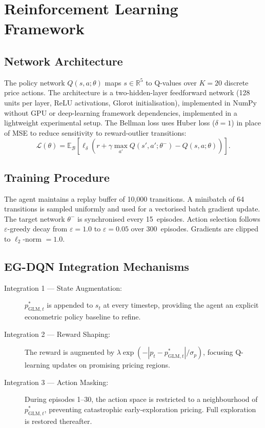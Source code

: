 \documentclass[journal, 10pt, twoside]{IEEEtran}
\begin{document}
\section{Reinforcement Learning Framework}
\label{sec:rl}

\subsection{Network Architecture}

The policy network $Q(s,a;\theta)$ maps $s\in\mathbb{R}^5$ to Q-values
over $K=20$ discrete price actions. The architecture is a two-hidden-layer
feedforward network (128 units per layer, ReLU activations, Glorot
initialisation), implemented in NumPy without GPU or deep-learning
framework dependencies, implemented in a lightweight experimental setup. The Bellman loss uses
Huber loss ($\delta=1$) in place of MSE to reduce sensitivity to
reward-outlier transitions:
\begin{equation}
  \mathcal{L}(\theta) = \mathbb{E}_{\mathcal{B}}
  \!\left[\ell_\delta\!\!\left(r + \gamma\max_{a'}
  Q(s',a';\theta^{-}) - Q(s,a;\theta)\right)\right].
  \label{eq:bellman}
\end{equation}

\subsection{Training Procedure}

The agent maintains a replay buffer of 10,000 transitions. A minibatch
of 64 transitions is sampled uniformly and used for a vectorised batch
gradient update. The target network $\theta^-$ is synchronised every
15~episodes. Action selection follows $\varepsilon$-greedy decay from
$\varepsilon=1.0$ to $\varepsilon=0.05$ over 300~episodes. Gradients are
clipped to $\ell_2$-norm $=1.0$.

\subsection{EG-DQN Integration Mechanisms}

\begin{description}
  \item[Integration 1 --- State Augmentation:]
    $p^*_{\text{GLM},t}$ is appended to $s_t$ at every timestep,
    providing the agent an explicit econometric policy baseline to
    refine.
  \item[Integration 2 --- Reward Shaping:]
    The reward is augmented by
    $\lambda\exp(-|p_t - p^*_{\text{GLM},t}|/\sigma_p)$, focusing
    Q-learning updates on promising pricing regions.
  \item[Integration 3 --- Action Masking:]
    During episodes 1--30, the action space is restricted to a
    neighbourhood of $p^*_{\text{GLM},t}$, preventing catastrophic
    early-exploration pricing. Full exploration is restored thereafter.
\end{description}
\end{document}
